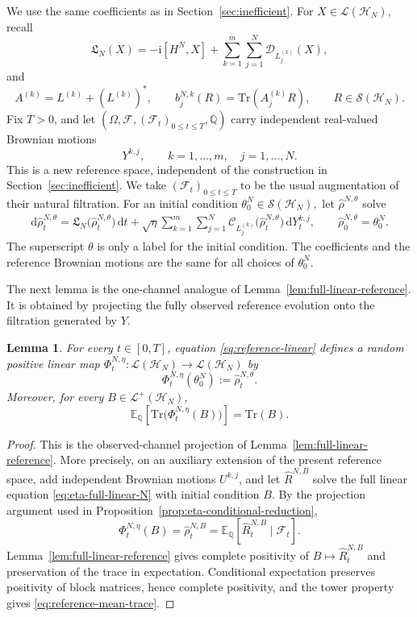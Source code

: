 \documentclass[10pt,a4paper,reqno]{amsart}
\numberwithin{equation}{section}
\theoremstyle{plain}
\newtheorem{lemma}[theorem]{Lemma}
\theoremstyle{definition}
\theoremstyle{remark}
\renewcommand{\d}{\mathrm d}
\renewcommand{\i}{\mathrm i}
\newcommand{\Tr}{\mathrm{Tr}}
\newcommand{\E}{\mathbb E}
\newcommand{\Q}{\mathbb Q}
\newcommand{\cS}{\mathcal S}
\newcommand{\cL}{\mathcal L}
\newcommand{\cF}{\mathcal F}
\newcommand{\cD}{\mathcal D}
\newcommand{\cC}{\mathcal C}
\newcommand{\HH}{\mathcal H}
\newcommand{\1}{\mathbf 1}
\begin{document}
We use the same coefficients as in Section~\ref{sec:inefficient}.  For \(X\in\cL(\HH_N)\),  recall 
\[
  \mathfrak L_N(X)=-\i[H^N,X]+\sum_{k=1}^m\sum_{j=1}^N\cD_{L_j^{(k)}}(X),
\]
and 
\[
  A^{(k)}=L^{(k)}+(L^{(k)})^*,
  \qquad
  b_j^{N,k}(R)=\Tr(A_j^{(k)}R),
  \qquad R\in\cS(\HH_N).
\]
Fix \(T>0\), and let
\(
  (\Omega,\cF,(\cF_t)_{0\le t\le T},\Q)
\)
carry independent real-valued Brownian motions
\[
  Y^{k,j},
  \qquad
   k=1,\ldots, m,
  \quad
   j=1, \ldots, N.
\]
This is a new reference space, independent of the construction in
Section~\ref{sec:inefficient}.  We take $(\cF_t)_{0\le t\le T}$ to be the usual augmentation of their
natural filtration.
For an initial condition
\(
  \theta_0^N\in\cS(\HH_N),
\)
let \(\widehat\rho^{N,\theta}\) solve
\begin{equation}
\begin{aligned}
  \d\widehat\rho_t^{N,\theta}
  =
  \mathfrak L_N
  \bigl(
    \widehat\rho_t^{N,\theta}
  \bigr)\,\d t+
  \sqrt{\eta}
  \sum_{k=1}^m\sum_{j=1}^N
  \cC_{L_j^{(k)}}
  \bigl(
    \widehat\rho_t^{N,\theta}
  \bigr)\,\d Y_t^{k,j},
  \qquad 
  \widehat\rho_0^{N,\theta}
  =
  \theta_0^N.
\end{aligned}
  \label{eq:reference-linear}
\end{equation}
The superscript \(\theta\) is only a label for the initial condition.  The
coefficients and the reference Brownian motions are the same for all
choices of \(\theta_0^N\).

The next lemma is the one-channel analogue of Lemma~\ref{lem:full-linear-reference}.  It is obtained by projecting the fully observed reference evolution onto the filtration generated by \(Y\).

\begin{lemma}
\label{lem:CP-reference}
For every \(t\in[0,T]\), equation \eqref{eq:reference-linear} defines a
random positive linear map $ \Phi_t^{N,\eta}:\cL(\HH_N)\longrightarrow\cL(\HH_N)$ by
\[
  \Phi_t^{N,\eta}(\theta_0^N)
  :=
  \widehat\rho_t^{N,\theta}.
\]
Moreover, for every \(B\in\cL^+(\HH_N)\),
\begin{equation}
  \E_{\Q}\left[
    \Tr\bigl(\Phi_t^{N,\eta}(B)\bigr)
  \right]
  =
  \Tr(B).
  \label{eq:reference-mean-trace}
\end{equation}
\end{lemma}

\begin{proof}
This is the observed-channel projection of Lemma~\ref{lem:full-linear-reference}.  More precisely, on an auxiliary extension of the present reference space, add independent Brownian motions \(U^{k,j}\), and let \(\widehat R^{N,B}\) solve the full linear equation \eqref{eq:eta-full-linear-N} with initial condition \(B\).  By the projection argument used in Proposition~\ref{prop:eta-conditional-reduction},
\[
  \Phi_t^{N,\eta}(B)
  =
  \widehat\rho_t^{N,B}
  =
  \E_{\Q}\left[
    \widehat R_t^{N,B}\mid\cF_t
  \right].
\]
Lemma~\ref{lem:full-linear-reference} gives complete positivity of \(B\mapsto\widehat R_t^{N,B}\) and preservation of the trace in expectation.  Conditional expectation preserves positivity of block matrices, hence complete positivity, and the tower property gives \eqref{eq:reference-mean-trace}.
\end{proof}
\end{document}
